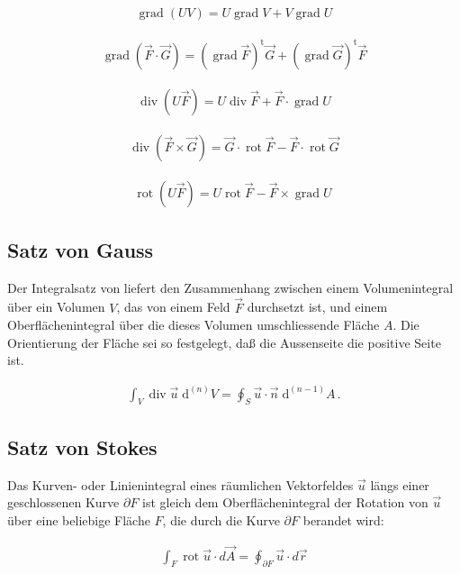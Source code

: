 \documentclass[a4paper]{scrartcl}
\begin{document}
\begin{align}
\operatorname{grad}(UV)=U\operatorname{grad}V+V\operatorname{grad}U
\end{align}

\begin{align}
\operatorname{grad}(\vec{F}\cdot \vec{G}) =
(\operatorname{grad}\vec{F})^{\operatorname t}\vec{G} + (\operatorname{grad}\vec{G})^{\operatorname t}\vec{F}
\end{align}

\begin{align}
\operatorname{div}(U\vec{F})=U\operatorname{div}\vec{F}+
\vec{F}\cdot\operatorname{grad}U
\end{align}

\begin{align}
\operatorname{div}(\vec{F}\times \vec{G})= \vec{G} \cdot
\operatorname{rot}\vec{F} -\vec{F}\cdot\operatorname{rot}\vec{G}
\end{align}

\begin{align}
\operatorname{rot}(U\vec{F})= U\operatorname{rot}\vec{F}
-\vec{F}\times\operatorname{grad}U\
\end{align}
\subsection{Satz von Gauss}
Der Integralsatz von  liefert den Zusammenhang zwischen einem Volumenintegral
über ein Volumen $V$, das von einem Feld $\vec F$ durchsetzt ist, und einem
Oberflächenintegral über die dieses Volumen umschliessende Fläche $A$. Die
Orientierung der Fläche sei so festgelegt, daß die Aussenseite die positive
Seite ist.

\begin{align}
\int_V \operatorname{div} \vec u \; \mathrm d^{(n)}V = \oint_{S} \vec u \cdot
\vec n\; \mathrm d^{(n-1)}A\,.
\end{align}
\subsection{Satz von Stokes}
Das Kurven- oder Linienintegral eines räumlichen Vektorfeldes $\vec u$ längs
einer geschlossenen Kurve $\partial F$ ist gleich dem Oberflächenintegral der
Rotation von $\vec u$ über eine beliebige Fläche $F$, die durch die Kurve
$\partial F$ berandet wird:

\begin{align}
 \int_{F} \operatorname{rot} \vec u \cdot d \vec A =
\oint_{\partial F} \vec u \cdot d \vec r
\end{align}
\end{document}
